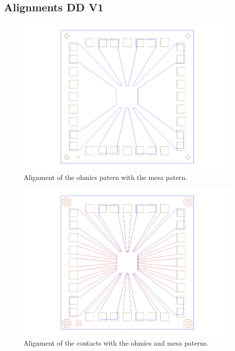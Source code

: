 \subsection{Alignments DD V1}

\begin{figure} [h] \centering
\includegraphics[scale=0.3]{fig/align1.pdf}
\caption{Alignment of the ohmics patern with the mesa patern.} \label{align1}
\end{figure}

\begin{figure} [h] \centering
\includegraphics[scale=0.3]{fig/align2.pdf}
\caption{Alignment of the contacts with the ohmics and mesa paterns.} \label{align2}
\end{figure}

\newpage

